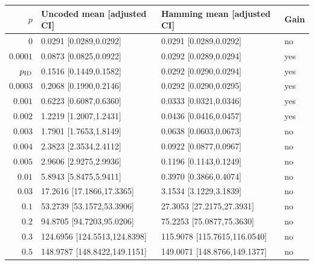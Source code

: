 \begin{tabular}{rlll}
\toprule
$p$ & Uncoded mean [adjusted CI] & Hamming mean [adjusted CI] & Gain \\
\midrule
$0$ & 0.0291 [0.0289,0.0292] & 0.0291 [0.0289,0.0292] & no \\
$0.0001$ & 0.0873 [0.0825,0.0922] & 0.0292 [0.0289,0.0294] & yes \\
$p_{\rm ID}$ & 0.1516 [0.1449,0.1582] & 0.0292 [0.0290,0.0294] & yes \\
$0.0003$ & 0.2068 [0.1990,0.2146] & 0.0292 [0.0290,0.0295] & yes \\
$0.001$ & 0.6223 [0.6087,0.6360] & 0.0333 [0.0321,0.0346] & yes \\
$0.002$ & 1.2219 [1.2007,1.2431] & 0.0436 [0.0416,0.0457] & yes \\
$0.003$ & 1.7901 [1.7653,1.8149] & 0.0638 [0.0603,0.0673] & no \\
$0.004$ & 2.3823 [2.3534,2.4112] & 0.0922 [0.0877,0.0967] & no \\
$0.005$ & 2.9606 [2.9275,2.9936] & 0.1196 [0.1143,0.1249] & no \\
$0.01$ & 5.8943 [5.8475,5.9411] & 0.3970 [0.3866,0.4074] & no \\
$0.03$ & 17.2616 [17.1866,17.3365] & 3.1534 [3.1229,3.1839] & no \\
$0.1$ & 53.2739 [53.1572,53.3906] & 27.3053 [27.2175,27.3931] & no \\
$0.2$ & 94.8705 [94.7203,95.0206] & 75.2253 [75.0877,75.3630] & no \\
$0.3$ & 124.6956 [124.5513,124.8398] & 115.9078 [115.7615,116.0540] & no \\
$0.5$ & 148.9787 [148.8422,149.1151] & 149.0071 [148.8766,149.1377] & no \\
\bottomrule
\end{tabular}
